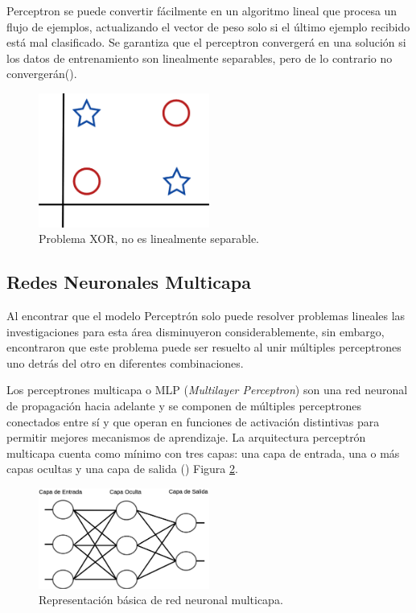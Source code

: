 Perceptron se puede convertir fácilmente en un algoritmo lineal que procesa un flujo de ejemplos, actualizando el vector de peso solo si el último ejemplo recibido está mal clasificado. Se garantiza que el perceptron convergerá en una solución si los datos de entrenamiento son linealmente separables, pero de lo contrario no convergerán(\cite{flach2012Machine}).

\begin{figure}[H]
    \centering
    \includegraphics[width=0.5\textwidth]{MarcoTeorico/imgs/XOR.png}
    \caption{Problema XOR, no es linealmente separable.}
    \label{fig:xor}
\end{figure}


\subsection{Redes Neuronales Multicapa}


Al encontrar que el modelo Perceptrón solo puede resolver problemas lineales las investigaciones para esta área disminuyeron considerablemente, sin embargo, \citeauthor{rumelhart1986Parallel} encontraron que este problema puede ser resuelto al unir múltiples perceptrones uno detrás del otro en diferentes combinaciones.

Los perceptrones multicapa o MLP (\textit{Multilayer Perceptron}) son una red neuronal de propagación hacia adelante y se componen de múltiples perceptrones conectados entre sí y que operan en funciones de activación distintivas para permitir mejores mecanismos de aprendizaje. La arquitectura perceptrón multicapa cuenta como mínimo con tres capas: una capa de entrada, una o más capas ocultas y una capa de salida (\cite{swamynathan2017Mastering}) Figura \ref{fig:mlp}.

\begin{figure}[H]
    \centering
    \includegraphics[width=0.5\textwidth]{MarcoTeorico/imgs/MLP.png}
    \caption{Representación básica de red neuronal multicapa.}
    \label{fig:mlp}
\end{figure}

